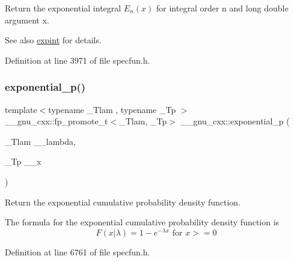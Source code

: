 Return the exponential integral $ E_n(x) $ for integral order {\ttfamily n} and {\ttfamily long double} argument {\ttfamily x}.

\begin{DoxySeeAlso}{See also}
\hyperlink{group__mathsf__gnu_gadaf9317953b826975da72d1858f01ea5}{expint} for details. 
\end{DoxySeeAlso}


Definition at line 3971 of file specfun.\+h.

\mbox{\label{group__mathsf__gnu_gaa546f47f8ab943d2c10b56bec8a44079}} 
\subsubsection{\texorpdfstring{exponential\+\_\+p()}{exponential\_p()}}
{\footnotesize\ttfamily template$<$typename \+\_\+\+Tlam , typename \+\_\+\+Tp $>$ \\
\+\_\+\+\_\+gnu\+\_\+cxx\+::fp\+\_\+promote\+\_\+t$<$\+\_\+\+Tlam, \+\_\+\+Tp$>$ \+\_\+\+\_\+gnu\+\_\+cxx\+::exponential\+\_\+p (\begin{DoxyParamCaption}\item[{\+\_\+\+Tlam}]{\+\_\+\+\_\+lambda,  }\item[{\+\_\+\+Tp}]{\+\_\+\+\_\+x }\end{DoxyParamCaption})\hspace{0.3cm}{\ttfamily [inline]}}



Return the exponential cumulative probability density function. 

The formula for the exponential cumulative probability density function is \[ F(x|\lambda) = 1 - e^{-\lambda x} \mbox{ for } x >= 0 \] 

Definition at line 6761 of file specfun.\+h.

\mbox{\label{group__mathsf__gnu_ga7f35499a94fd8930810809988332161e}} 

